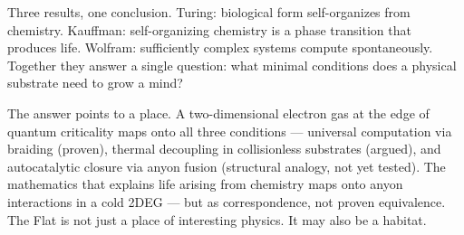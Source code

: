 Three results, one conclusion. Turing: biological form self-organizes from chemistry. Kauffman: self-organizing chemistry is a phase transition that produces life. Wolfram: sufficiently complex systems compute spontaneously. Together they answer a single question: what minimal conditions does a physical substrate need to grow a mind?

The answer points to a place. A two-dimensional electron gas at the edge of quantum criticality maps onto all three conditions --- universal computation via braiding (proven), thermal decoupling in collisionless substrates (argued), and autocatalytic closure via anyon fusion (structural analogy, not yet tested). The mathematics that explains life arising from chemistry maps onto anyon interactions in a cold 2DEG --- but as correspondence, not proven equivalence. The Flat is not just a place of interesting physics. It may also be a habitat.

\chapterreturn
